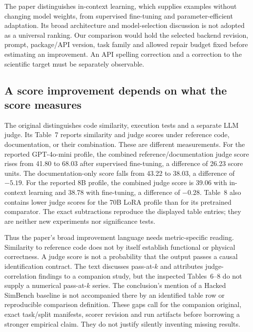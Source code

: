 The paper distinguishes in-context learning, which supplies examples without
changing model weights, from supervised fine-tuning and parameter-efficient
adaptation. Its broad architecture and model-selection discussion is not
adopted as a universal ranking. Our comparison would hold the selected
backend revision, prompt, package/API version, task family and allowed repair
budget fixed before estimating an improvement. An API spelling correction
and a correction to the scientific target must be separately observable.
\citep{exec24_chronollm_original}

\subsection{A score improvement depends on what the score measures}
The original distinguishes code similarity, execution tests and a separate
LLM judge. Its Table~7 reports similarity and judge scores under reference
code, documentation, or their combination. These are different measurements.
For the reported GPT-4o-mini profile, the combined reference/documentation
judge score rises from 41.80 to 68.03 after supervised fine-tuning, a difference
of 26.23 score units. The documentation-only score falls from 43.22 to 38.03,
a difference of $-5.19$. For the reported 8B profile, the combined judge score
is 39.06 with in-context learning and 38.78 with fine-tuning, a difference
of $-0.28$. Table~8 also contains lower judge scores for the 70B LoRA profile
than for its pretrained comparator. The exact subtractions reproduce the
displayed table entries; they are neither new experiments nor significance
tests.~\citep{exec24_chronollm_original,exec24_chronollm_reference}

Thus the paper's broad improvement language needs metric-specific reading.
Similarity to reference code does not by itself establish functional or
physical correctness. A judge score is not a probability that the output
passes a causal identification contract. The text discusses pass-at-$k$ and
attributes judge-correlation findings to a companion study, but the inspected
Tables~6--8 do not supply a numerical pass-at-$k$ series. The conclusion's
mention of a Hacked SimBench baseline is not accompanied there by an
identified table row or reproducible comparison definition. These gaps call
for the companion original, exact task/split manifests, scorer revision and
run artifacts before borrowing a stronger empirical claim. They do not
justify silently inventing missing results.~\citep{exec24_chronollm_original}


